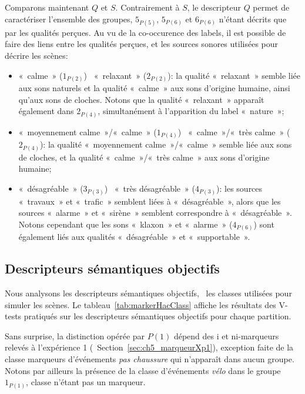 Comparons maintenant $Q$ et $S$. Contrairement à $S$, le descripteur $Q$ permet de caractériser l'ensemble des groupes, $5_{P(5)}$, $5_{P(6)}$ et $6_{P(6)}$ n'étant décrits que par les qualités perçues. Au vu de la co-occurence des labels, il est possible de faire des liens entre les qualités perçues, et les sources sonores utilisées pour décrire les scènes:


\begin{itemize}
\item «~calme~» ($1_{P(2)}$) \vs~«~relaxant~» ($2_{P(2)}$): la qualité «~relaxant~» semble liée aux sons naturels et la qualité «~calme~» aux sons d'origine humaine, ainsi qu'aux sons de cloches. Notons que la qualité «~relaxant~» apparaît également dans $2_{P(4)}$, simultanément à l'apparition du label «~nature~»;
\item «~moyennement calme~»/«~calme~» ($1_{P(4)}$) \vs~«~calme~»/«~très calme~» ($2_{P(4)}$): la qualité «~moyennement calme~»/«~calme~» semble liée aux sons de cloches, et la qualité «~calme~»/«~très calme~» aux sons d'origine humaine;
\item «~désagréable~» ($3_{P(3)}$) \vs~«~très désagréable~» ($4_{P(3)}$): les sources «~travaux~» et «~trafic~» semblent liées à «~désagréable~», alors que les sources «~alarme~» et «~sirène~» semblent correspondre à «~désagréable~». Notons cependant que les sons «~klaxon~» et «~alarme~» ($4_{P(6)}$) sont également liés aux qualités «~désagréable~» et «~supportable~».
\end{itemize}

\subsection{Descripteurs sémantiques objectifs}

Nous analysons les descripteurs sémantiques objectifs, \ie~les classes utilisées pour simuler les scènes. Le tableau~\ref{tab:markerHacClass} affiche les résultats des V-tests pratiqués sur les descripteurs sémantiques objectifs pour chaque partition.

Sans surprise, la distinction opérée par $P(1)$ dépend des i et ni-marqueurs relevés à l'expérience 1 (\cf~Section~\ref{sec:ch5_marqueurXp1}), exception faite de la classe marqueurs d'événements \emph{pas chaussure} qui n'apparaît dans aucun groupe. Notons par ailleurs la présence de la classe d'événements \emph{vélo} dans le groupe $1_{P(1)}$, classe n'étant pas un marqueur.


